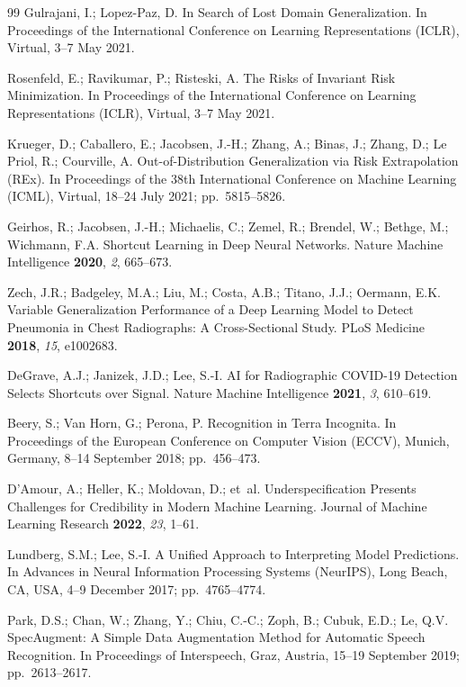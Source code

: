 \documentclass[sensors,article,submit,pdftex,oneauthor]{Definitions/mdpi}
\begin{document}
\begin{thebibliography}{99}
Gulrajani, I.; Lopez-Paz, D.
In Search of Lost Domain Generalization. In Proceedings of
the International Conference on Learning Representations
(ICLR), Virtual, 3--7 May 2021.

Rosenfeld, E.; Ravikumar, P.; Risteski, A.
The Risks of Invariant Risk Minimization. In Proceedings of
the International Conference on Learning Representations
(ICLR), Virtual, 3--7 May 2021.

Krueger, D.; Caballero, E.; Jacobsen, J.-H.; Zhang, A.;
Binas, J.; Zhang, D.; Le Priol, R.; Courville, A.
Out-of-Distribution Generalization via Risk Extrapolation
(REx). In Proceedings of the 38th International Conference
on Machine Learning (ICML), Virtual, 18--24 July 2021;
pp.~5815--5826.

Geirhos, R.; Jacobsen, J.-H.; Michaelis, C.; Zemel, R.;
Brendel, W.; Bethge, M.; Wichmann, F.A.
Shortcut Learning in Deep Neural Networks. Nature Machine
Intelligence \textbf{2020}, \emph{2}, 665--673.

Zech, J.R.; Badgeley, M.A.; Liu, M.; Costa, A.B.;
Titano, J.J.; Oermann, E.K.
Variable Generalization Performance of a Deep Learning Model
to Detect Pneumonia in Chest Radiographs: A Cross-Sectional
Study. PLoS Medicine \textbf{2018}, \emph{15}, e1002683.

DeGrave, A.J.; Janizek, J.D.; Lee, S.-I.
AI for Radiographic COVID-19 Detection Selects Shortcuts
over Signal. Nature Machine Intelligence \textbf{2021},
\emph{3}, 610--619.

Beery, S.; Van Horn, G.; Perona, P.
Recognition in Terra Incognita. In Proceedings of the
European Conference on Computer Vision (ECCV), Munich,
Germany, 8--14 September 2018; pp.~456--473.

D'Amour, A.; Heller, K.; Moldovan, D.; et~al.
Underspecification Presents Challenges for Credibility in
Modern Machine Learning. Journal of Machine Learning
Research \textbf{2022}, \emph{23}, 1--61.

Lundberg, S.M.; Lee, S.-I.
A Unified Approach to Interpreting Model Predictions. In
Advances in Neural Information Processing Systems (NeurIPS),
Long Beach, CA, USA, 4--9 December 2017; pp.~4765--4774.

Park, D.S.; Chan, W.; Zhang, Y.; Chiu, C.-C.; Zoph, B.;
Cubuk, E.D.; Le, Q.V.
SpecAugment: A Simple Data Augmentation Method for Automatic
Speech Recognition. In Proceedings of Interspeech, Graz,
Austria, 15--19 September 2019; pp.~2613--2617.


\end{thebibliography}
\end{document}
